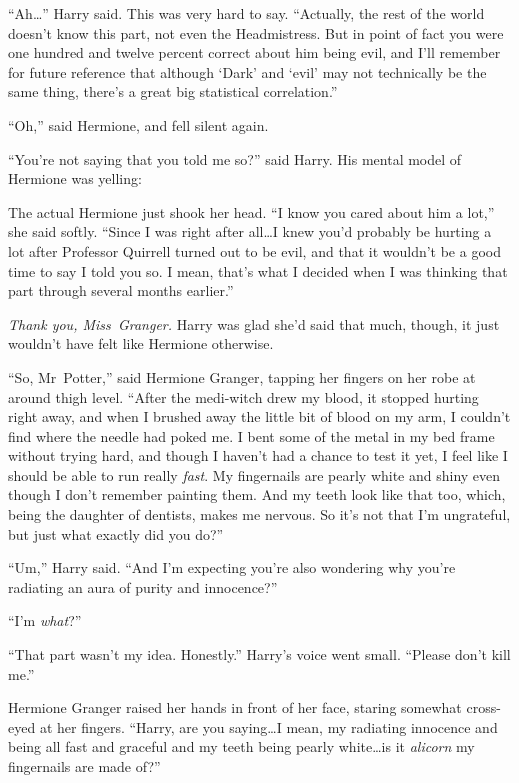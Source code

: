 “Ah…” Harry said. This was very hard to say. “Actually, the rest of the world doesn’t know this part, not even the Headmistress. But in point of fact you were one hundred and twelve percent correct about him being evil, and I’ll remember for future reference that although ‘Dark’ and ‘evil’ may not technically be the same thing, there’s a great big statistical correlation.”

“Oh,” said Hermione, and fell silent again.

“You’re not saying that you told me so?” said Harry. His mental model of Hermione was yelling: 

The actual Hermione just shook her head. “I know you cared about him a lot,” she said softly. “Since I was right after all…I knew you’d probably be hurting a lot after Professor Quirrell turned out to be evil, and that it wouldn’t be a good time to say I told you so. I mean, that’s what I decided when I was thinking that part through several months earlier.”

\emph{Thank you, Miss~Granger.} Harry was glad she’d said that much, though, it just wouldn’t have felt like Hermione otherwise.

“So, Mr~Potter,” said Hermione Granger, tapping her fingers on her robe at around thigh level. “After the medi-witch drew my blood, it stopped hurting right away, and when I brushed away the little bit of blood on my arm, I couldn’t find where the needle had poked me. I bent some of the metal in my bed frame without trying hard, and though I haven’t had a chance to test it yet, I feel like I should be able to run really \emph{fast}. My fingernails are pearly white and shiny even though I don’t remember painting them. And my teeth look like that too, which, being the daughter of dentists, makes me nervous. So it’s not that I’m ungrateful, but just what exactly did you do?”

“Um,” Harry said. “And I’m expecting you’re also wondering why you’re radiating an aura of purity and innocence?”

“I’m \emph{what}?”

“That part wasn’t my idea. Honestly.” Harry’s voice went small. “Please don’t kill me.”

Hermione Granger raised her hands in front of her face, staring somewhat cross-eyed at her fingers. “Harry, are you saying…I mean, my radiating innocence and being all fast and graceful and my teeth being pearly white…is it \emph{alicorn} my fingernails are made of?”

